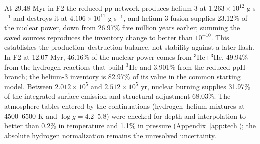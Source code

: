 At 29.48 Myr in F2 the reduced pp network produces helium-3 at
$1.263\times10^{12}$ g s$^{-1}$ and destroys it at $4.106\times10^{11}$
g s$^{-1}$, and helium-3 fusion supplies 23.12\% of the nuclear power,
down from 26.97\% five million years earlier; summing the saved sources
reproduces the inventory change to better than $10^{-10}$. This
establishes the production--destruction balance, not stability against a
later flash. In F2 at 12.07 Myr, 46.16\% of the nuclear power comes from
$^3$He+$^3$He, 49.94\% from the hydrogen reactions that build $^3$He and
3.901\% from the reduced ppII branch; the helium-3 inventory is 82.97\% of
its value in the common starting model. Between $2.012\times10^5$ and
$2.512\times10^5$ yr, nuclear burning supplies 31.97\% of the integrated
surface emission and structural adjustment 68.03\%. The atmosphere tables
entered by the continuations (hydrogen--helium mixtures at 4500--6500 K and
$\log g=4.2$--5.8) were checked for depth and interpolation to better than
0.2\% in temperature and 1.1\% in pressure (Appendix~\ref{app:tech}); the
absolute hydrogen normalization remains the unresolved uncertainty.
